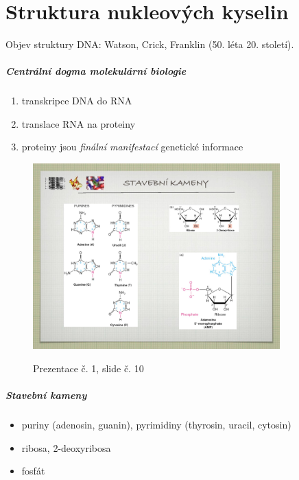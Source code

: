 \documentclass[DIV=8]{scrreprt}
\begin{document}
\chapter{Struktura nukleových kyselin} \label{Struktura nukleových kyselin}

Objev struktury DNA: Watson, Crick, Franklin (50. léta 20. století).

\paragraph{Centrální dogma molekulární biologie}
\begin{enumerate}[nosep]
    \item transkripce DNA do RNA
    \item translace RNA na proteiny
    \item proteiny jsou \emph{finální manifestací} genetické informace
\end{enumerate}



\begin{figure}
    \caption{Prezentace č. 1, slide č. 10}
    \includegraphics[width=0.85\textwidth]{slides-1/slide-10.jpg}
    \centering
    \label{slides-1-slide-10}
\end{figure}

\paragraph{Stavební kameny}
\begin{itemize}[nosep]
    \item puriny (adenosin, guanin), pyrimidiny (thyrosin, uracil, cytosin)
    \item ribosa, 2-deoxyribosa
    \item fosfát
\end{itemize}
\end{document}
